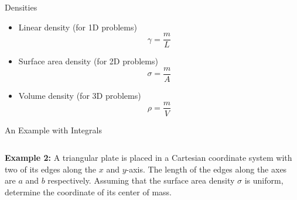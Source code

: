 \documentclass[12pt,compress,aspectratio=169]{beamer}
\begin{document}
\begin{frame}{Densities}
  \begin{itemize}
  \item Linear density (for 1D problems)
    {\Large
      \begin{displaymath}
        \gamma=\frac{m}{L}
      \end{displaymath}
    }
  \item Surface area density (for 2D problems)
    {\Large
      \begin{displaymath}
        \sigma=\frac{m}{A}
      \end{displaymath}
    }
  \item Volume density (for 3D problems)
    {\Large
      \begin{displaymath}
        \rho=\frac{m}{V}
      \end{displaymath}
    }
  \end{itemize}
\end{frame}


\begin{frame}{An Example with Integrals}
  \begin{columns}
    \textbf{Example 2:} A triangular plate is placed in a Cartesian coordinate
    system with two of its edges along the $x$ and $y$-axis. The length of the
    edges along the axes are $a$ and $b$ respectively. Assuming that the
    surface area density $\sigma$ is uniform, determine the coordinate of its
    center of mass.

  \end{columns}
\end{frame}
\end{document}
